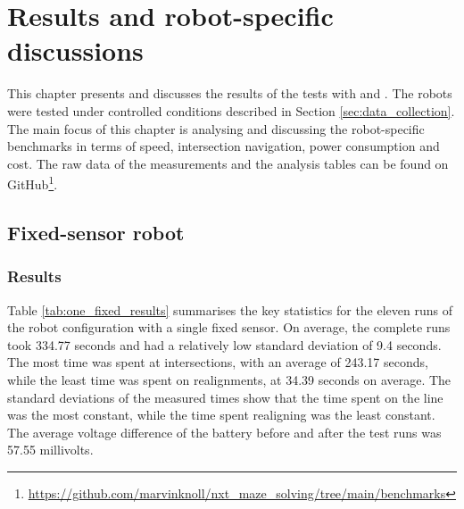 \section{Results and robot-specific discussions} \label{sec:results}

This chapter presents and discusses the results of the tests with \FixRob and \TurnRob. The robots were tested under controlled conditions described in Section \ref{sec:data_collection}. The main focus of this chapter is analysing and discussing the robot-specific benchmarks in terms of speed, intersection navigation, power consumption and cost. The raw data of the measurements and the analysis tables can be found on GitHub\footnote{\url{https://github.com/marvinknoll/nxt_maze_solving/tree/main/benchmarks}}.

\subsection{Fixed-sensor robot}

\subsubsection{Results} \label{sec:fixed_results}
Table \ref{tab:one_fixed_results} summarises the key statistics for the eleven runs of the robot configuration with a single fixed sensor. On average, the complete runs took 334.77 seconds and had a relatively low standard deviation of 9.4 seconds. The most time was spent at intersections, with an average of 243.17 seconds, while the least time was spent on realignments, at 34.39 seconds on average. The standard deviations of the measured times show that the time spent on the line was the most constant, while the time spent realigning was the least constant. The average voltage difference of the battery before and after the test runs was 57.55 millivolts.


